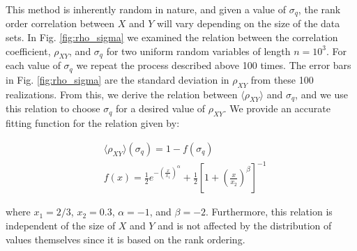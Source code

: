 \documentclass[a4paper,fleqn,usenatbib]{mnras}
\begin{document}
This method is inherently random in nature, and given a value of $\sigma_q$, the rank order correlation between $X$ and $Y$ will vary depending on the size of the data sets.  In Fig. \ref{fig:rho_sigma} we examined the relation between the correlation coefficient, $\rho_{XY}$, and $\sigma_q$ for two uniform random variables of length $n=10^{3}$.  For each value of $\sigma_q$ we repeat the process described above 100 times.  The error bars in Fig. \ref{fig:rho_sigma} are the standard deviation in $\rho_{XY}$ from these 100 realizations.  From this, we derive the relation between $\langle \rho_{XY} \rangle$ and $\sigma_q$, and we use this relation to choose $\sigma_q$ for a desired value of $\rho_{XY}$.  We provide an accurate fitting function for the relation given by:
%
\begin{linenomath}
\begin{align}
\label{eq:rho_fit_func}
&\langle \rho_{XY} \rangle(\sigma_q) = 1-f(\sigma_q) \\
&f(x) = \frac{1}{2}e^{-\left(\frac{x}{x_1}\right)^{\alpha}} + \frac{1}{2} \left[1+ \left( \frac{x}{x_2} \right)^{\beta} \right]^{-1} \nonumber
\end{align}
\end{linenomath}
% 
where $x_1=2/3$, $x_2=0.3$, $\alpha=-1$, and $\beta=-2$.  Furthermore, this relation is independent of the size of $X$ and $Y$ and is not affected by the distribution of values themselves since it is based on the rank ordering.

%
%
\end{document}
